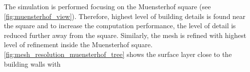 The simulation is performed focusing on the Muensterhof square (see \cref{fig:muensterhof_view}). Therefore, highest level of building details is found near the square and to increase the computation performance, the level of detail is reduced further away from the square. Similarly, the mesh is refined with highest level of refinement inside the Muensterhof square. \cref{fig:mesh_resolution_muensterhof_tree} shows the surface layer close to the building walls with 


